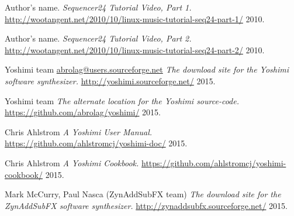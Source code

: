 \begin{thebibliography}{99}
   Author's name.
   \emph{Sequencer24 Tutorial Video, Part 1.}
   \url{http://wootangent.net/2010/10/linux-music-tutorial-seq24-part-1/}
   2010.

   Author's name.
   \emph{Sequencer24 Tutorial Video, Part 2.}
   \url{http://wootangent.net/2010/10/linux-music-tutorial-seq24-part-2/}
   2010.

   Yoshimi team \url{abrolag@users.sourceforge.net}
   \emph{The download site for the Yoshimi software synthesizer.}
   \url{http://yoshimi.sourceforge.net/}
   2015.

   Yoshimi team
   \emph{The alternate location for the Yoshimi source-code.}
   \url{https://github.com/abrolag/yoshimi/}
   2015.

   Chris Ahlstrom
   \emph{A Yoshimi User Manual.}
   \url{https://github.com/ahlstromcj/yoshimi-doc/}
   2015.

   Chris Ahlstrom
   \emph{A Yoshimi Cookbook.}
   \url{https://github.com/ahlstromcj/yoshimi-cookbook/}
   2015.

   Mark McCurry, Paul Nasca (ZynAddSubFX team)
   \emph{The download site for the ZynAddSubFX software synthesizer.}
   \url{http://zynaddsubfx.sourceforge.net/}
   2015.

\end{thebibliography}

